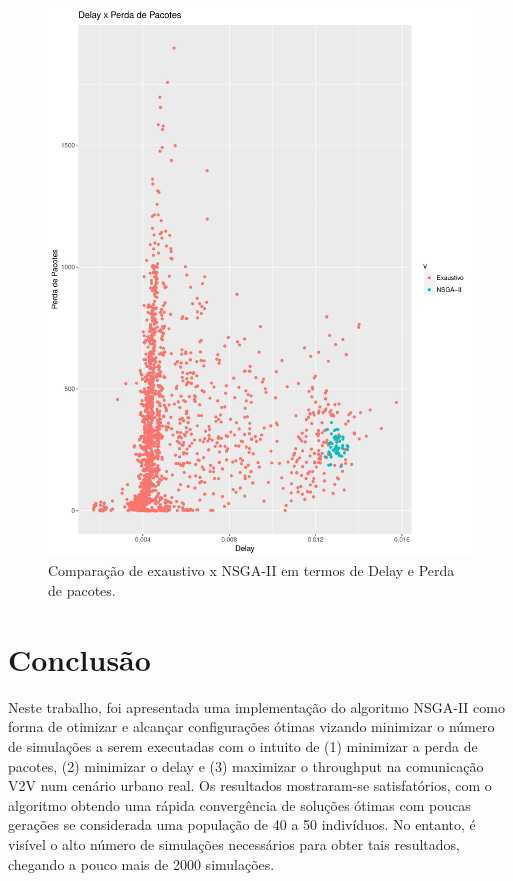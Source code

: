 \documentclass[conference]{IEEEtran}
\begin{document}
\begin{figure}[h]
  \centering
  \includegraphics[scale=0.30]{figures/ExaustivoXNsgaii_DelayXPerdaPacotes.pdf}
  \caption{Comparação de exaustivo x NSGA-II em termos de Delay e Perda de pacotes.}
  \label{fig:exaustivo-nsgaii-3}
\end{figure}



\section{Conclusão}

Neste trabalho, foi apresentada uma implementação do algoritmo NSGA-II
como forma de otimizar e alcançar configurações ótimas vizando
minimizar o número de simulações a serem executadas com o intuito de
(1) minimizar a perda de pacotes, (2) minimizar o delay e (3)
maximizar o throughput na comunicação V2V num cenário urbano real.  Os
resultados mostraram-se satisfatórios, com o algoritmo obtendo uma
rápida convergência de soluções ótimas com poucas gerações se
considerada uma população de 40 a 50 indivíduos. No entanto, é visível
o alto número de simulações necessários para obter tais resultados,
chegando a pouco mais de 2000 simulações.



 
\end{document}

